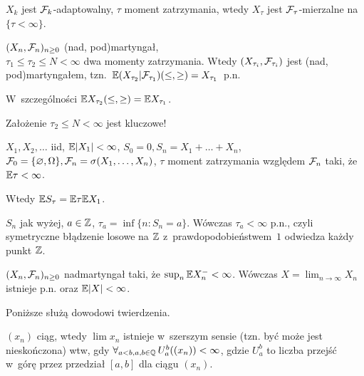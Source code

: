 



	\begin{proposition}
		$X_k$ jest $\mathcal{F}_k$-adaptowalny, $\tau$ moment zatrzymania, 
		wtedy $X_\tau$ jest $\mathcal{F}_\tau$-mierzalne na $\{ \tau < \infty\}$.
	\end{proposition}
	
	\begin{theorem}
		$(X_n, \mathcal{F}_n)_{n \geq 0}$ (nad, pod)martyngał,
		\\ ${\tau_1 \leq \tau_2 \leq N < \infty}$ dwa momenty zatrzymania.
		Wtedy $(X_{\tau_i}, \mathcal{F}_{\tau_i})$ jest (nad, pod)martyngałem,
		\mbox{tzn. $\mathbb{E}(X_{\tau_2}|\mathcal{F}_{\tau_1}) (\leq, \geq)= X_{\tau_1}$ p.n.}
		
		W~szczególności $\mathbb{E} X_{\tau _2} (\leq,\geq)= \mathbb{E} X_{\tau_1}$.
	\end{theorem}
	
	\begin{remark}
		Założenie $\tau_2 \leq N < \infty$ jest kluczowe!
	\end{remark}
	
	\begin{theorem}
		$X_1, X_2, \ldots$ iid, $\mathbb{E} |X_1| < \infty$, 
		$S_0 = 0, S_n = X_1 + \ldots + X_n$, 
		$\mathcal{F}_0=\{\varnothing, \Omega\}, \mathcal{F}_n=\sigma(X_1, \ldots, X_n)$,
		$\tau$ moment zatrzymania względem $\mathcal{F}_n$ 
		taki, że $\mathbb{E} \tau < \infty$.
		
		Wtedy $\mathbb{E} S_\tau = \mathbb{E} \tau \mathbb{E} X_1$.
	\end{theorem}
	
	\begin{fact}
		$S_n$ jak wyżej, $a \in {\mathbb{Z}}$, $\tau_a  = \inf\{n : S_n = a\}$.
		Wówczas $\tau_a < \infty$ p.n., czyli symetryczne błądzenie losowe na ${\mathbb{Z}}$ z~prawdopodobieństwem~$1$ odwiedza każdy punkt ${\mathbb{Z}}$.
	\end{fact}
	
	\begin{theorem}
		$(X_n, \mathcal{F}_n)_{n \geq 0}$ nadmartyngał 
		taki, że ${\sup_n \mathbb{E} X_n^- < \infty}$. 
		Wówczas $X = \lim_{n \to \infty} X_n$ istnieje p.n. 
		oraz $\mathbb{E} |X| < \infty$.
	\end{theorem}
	
	Poniższe służą dowodowi twierdzenia.
	
	\begin{fact}
		$(x_n)$ ciąg, wtedy $\lim x_n$ istnieje w~szerszym sensie 
		(tzn. być może jest nieskończona) wtw, gdy 
		$\forall_{a < b, a, b \in {\mathbb{Q}}}\, U_a^b((x_n)) < \infty$,
		gdzie $U_a^b$ to liczba przejść w~górę przez przedział 
		$[a,b]$ dla ciągu $(x_n)$.
	\end{fact}
	
